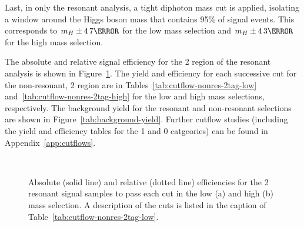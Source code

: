 Last, in only the resonant analysis, a tight diphoton mass cut is applied, isolating a window around the Higgs boson mass that contains 95\% of signal events. This corresponds to $m_H \pm \unit{4.7}{\GeV}$ for the low mass selection and $m_H \pm \unit{4.3}{\GeV}$ for the high mass selection.

The absolute and relative signal efficiency for the 2 \btag region of the resonant analysis is shown in Figure~\ref{fig:resonant-cutflow}. The yield and efficiency for each successive cut for the non-resonant, 2 \btag region are in Tables~\ref{tab:cutflow-nonres-2tag-low} and~\ref{tab:cutflow-nonres-2tag-high} for the low and high mass selections, respectively. The background yield for the resonant and non-resonant selections are shown in Figure~\ref{tab:background-yield}. Further cutflow studies (including the yield and efficiency tables for the 1 and 0 \btag catgeories) can be found in Appendix~\ref{app:cutflows}.

\begin{figure}[!htb]
  \centering
  \\
  \caption[Absolute and relative efficiencies for the 2 \btag category, high mass selection]{Absolute (solid line) and relative (dotted line) efficiencies for the 2 \btag resonant signal samples to pass each cut in the low (a) and high (b) mass selection. A description of the cuts is listed in the caption of Table~\ref{tab:cutflow-nonres-2tag-low}.}
  \label{fig:resonant-cutflow}
\end{figure}

